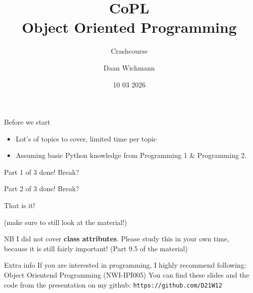 \documentclass{beamer}
\title{CoPL \\ Object Oriented Programming}
\subtitle{Crashcourse}
\author{Daan Wichmann}
\institute{Radboud University}
\date{10 03 2026}
\begin{document}
    \begin{frame}
        \maketitle 
    \end{frame}

    \begin{frame}{Before we start}
        \begin{itemize}
            \item Lot's of topics to cover, limited time per topic
            \item Assuming basic Python knowledge from Programming 1 \& Programming 2.
        \end{itemize}
    \end{frame}
    
    

    

    

    \begin{frame}[plain]
        Part 1 of 3 done! Break?
    \end{frame}

    

    

    

    \begin{frame}[plain]
        Part 2 of 3 done! Break?
    \end{frame}

    

    

    

    
    
    \begin{frame}[focus]
        That is it!
        
        (make sure to still look at the material!)
    \end{frame}

    \begin{frame}{NB}
        I did not cover \textbf{class attributes}. Please study this in your own time, because it is still fairly important! (Part 9.5 of the material)
    \end{frame}
    
    \begin{frame}{Extra info}
        If you are interested in programming, I highly recommend following: Object Orientend Programming (NWI-IPI005)
        \vfill
        You can find these slides and the code from the presentation on my github: \texttt{https://github.com/D21W12}
    \end{frame}
\end{document}
